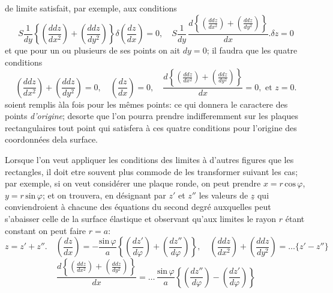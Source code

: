 \documentclass[11pt,a4paper]{article}
\begin{document}

de limite satisfait, par exemple, aux conditions
\[ S\frac{1}{dy}\left\{\left(\frac{ddz}{dx^2}\right) + \left(\frac{ddz}{dy^2}\right)\right\}\delta\left(\frac{dz}{dx}\right) = 0, \quad S\frac{1}{dy}\,\frac{d\left\{\left(\frac{ddz}{dx^2}\right) + \left(\frac{ddz}{dy^2}\right)\right\}}{dx}.\delta z = 0 \]
et que pour un ou plusieurs de ses points on
ait $dy=0$; il faudra que les quatre conditions
\[ \left(\frac{ddz}{dx^2}\right) + \left(\frac{ddz}{dy^2}\right) = 0, \quad \left(\frac{dz}{dx}\right) = 0, \quad \frac{d\left\{\left(\frac{ddz}{dx^2}\right) + \left(\frac{ddz}{dy^2}\right)\right\}}{dx} = 0, \text{ et } z=0. \]
soient remplis àla fois pour les mêmes points:
ce qui donnera le caractere des points \emph{d'origine};
desorte que l'on pourra prendre indifferemment
sur les plaques rectangulaires tout point qui
satisfera à ces quatre conditions pour l'origine
des coordonnées dela surface.

Lorsque l'on veut appliquer les conditions des limites
à d'autres figures que les rectangles, il doit etre souvent
plus commode de les transformer suivant les cas;
par exemple, si on veut considérer une plaque ronde,
on peut prendre $x = r\,\text{cos}\,\varphi$, $y = r\,\text{sin}\,\varphi$; et on trouvera,
en désignant par $z'$ et $z''$ les valeurs de $\underline{z}$ qui
conviendroient à chacune des équations du second degré
auxquelles peut s'abaisser celle de la surface élastique
et observant qu'aux limites le rayon $r$ étant constant
on peut  faire $r=a$:
\[ z = z' + z''. \quad \left(\frac{dz}{dx}\right) = -\frac{\text{sin}\,\varphi}{a}\left\{\left(\frac{dz'}{d\varphi}\right) + \left(\frac{dz''}{d\varphi}\right)\right\}, \quad \left(\frac{ddz}{dx^2}\right) + \left(\frac{ddz}{dy^2}\right) = \ldots\{z' - z''\} \]
\[ \frac{d\left\{\left(\frac{ddz}{dx^2}\right) + \left(\frac{ddz}{dy^2}\right)\right\}}{dx} = \ldots\,\frac{\text{sin}\,\varphi}{a}\left\{\left(\frac{dz''}{d\varphi}\right) - \left(\frac{dz'}{d\varphi}\right)\right\} \]
\end{document}
